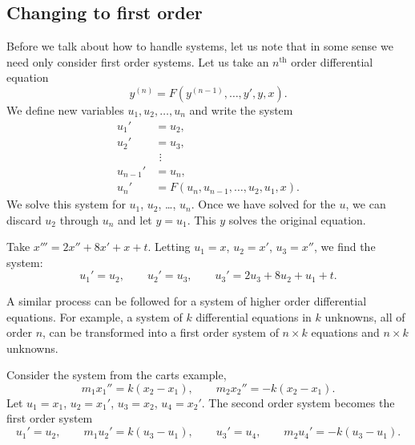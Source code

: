 \subsection{Changing to first order}

Before we talk about how to handle systems, let us note that
in some sense
we need only consider first order systems.
Let us
take an $n^{\text{th}}$ order differential equation
\begin{equation*}
y^{(n)} = F(y^{(n-1)},\ldots,y',y,x) .
\end{equation*}
We define new variables $u_1, u_2, \ldots, u_n$ and write the system
\begin{align*}
u_1' & = u_2 , \\
u_2' & = u_3 , \\
& ~\, \vdots \\
u_{n-1}' & = u_n , \\
u_n' & = F(u_n,u_{n-1},\ldots,u_2,u_1,x) .
\end{align*}
We solve
this system for $u_1$, $u_2$, \ldots, $u_n$.  Once we have solved
for the $u$,
we can discard $u_2$ through $u_n$ and let $y = u_1$.
This $y$ solves the original equation.

\begin{example}
Take $x''' = 2x''+ 8x' + x + t$.  Letting $u_1 = x$, $u_2 = x'$, $u_3
= x''$, we find the system:
\begin{equation*}
u_1' = u_2, \qquad u_2' = u_3, \qquad u_3' = 2u_3 + 8u_2 + u_1 + t .
\end{equation*}
\end{example}

A similar process can be followed for a system of higher order differential
equations.  For example, a system of $k$ differential equations in $k$
unknowns, all of order $n$, can be transformed into a first
order system of $n \times k$
equations and $n \times k$ unknowns.

\begin{example}
Consider the system from the carts example,
\begin{equation*}
m_1 x_1''  = k(x_2-x_1), \qquad m_2 x_2'' = - k(x_2-x_1) .
\end{equation*}
Let $u_1 = x_1$, $u_2 = x_1'$, 
$u_3 = x_2$, $u_4 = x_2'$.  The second order system becomes the
first order system
\begin{equation*}
u_1' = u_2, \qquad
m_1 u_2'  = k(u_3-u_1), \qquad
u_3' = u_4, \qquad
m_2 u_4' = - k(u_3-u_1) .
\end{equation*}
\end{example}


